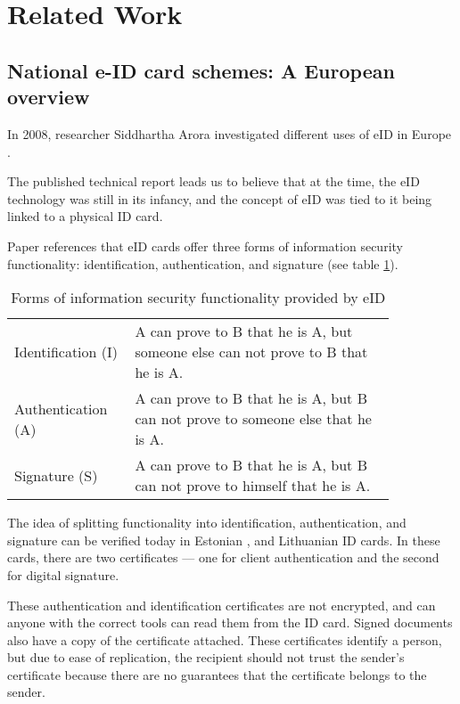 \section{Related Work}

\subsection{National e-ID card schemes: A European overview}

In 2008, researcher Siddhartha Arora investigated different uses of eID in Europe \cite{ARORA200846}.

The published technical report leads us to believe that at the time, the eID technology was still in its infancy, and the concept of eID was tied to it being linked to a physical ID card.

Paper references that eID cards offer three forms of information security functionality: identification, authentication, and signature (see table \ref{tab:formsofinfosecurity}).

\begin{table}[h]
    \begin{center}
        \caption{Forms of information security functionality provided by eID \cite{ARORA200846, fiat1986prove}}
        \label{tab:formsofinfosecurity}
        \begin{tabular}{p{0.25\linewidth} | p{0.6\linewidth}}
            Identification (I) & A can prove to B that he is A, but someone else can not prove to B that he is A. \\
            Authentication (A) & A can prove to B that he is A, but B can not prove to someone else that he is A. \\
            Signature (S)      & A can prove to B that he is A, but B can not prove to himself that he is A.
        \end{tabular}
    \end{center}
\end{table}

The idea of splitting functionality into identification, authentication, and signature can be verified today in Estonian \cite{ee-id-tech}, and Lithuanian \cite{lt-id-howtouse} ID cards. In these cards, there are two certificates — one for client authentication and the second for digital signature.

These authentication and identification certificates are not encrypted, and can anyone with the correct tools can read them from the ID card. Signed documents also have a copy of the certificate attached. These certificates identify a person, but due to ease of replication, the recipient should not trust the sender's certificate because there are no guarantees that the certificate belongs to the sender.

